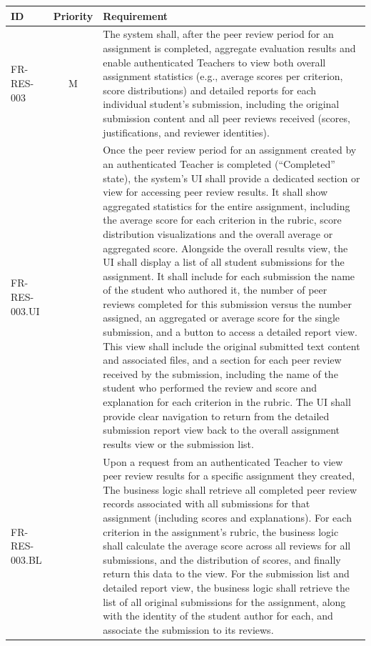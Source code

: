\begin{longtable}{|l|c|p{10cm}|}
    \hline
    \textbf{ID} & \textbf{Priority} & \textbf{Requirement} \\
    \endhead %
    \hline
    FR-RES-003 & M & The system shall, after the peer review period for an assignment is completed, aggregate evaluation results and enable authenticated Teachers to view both overall assignment statistics (e.g., average scores per criterion, score distributions) and detailed reports for each individual student's submission, including the original submission content and all peer reviews received (scores, justifications, and reviewer identities). \\
    \quad FR-RES-003.UI &  & \quad Once the peer review period for an assignment created by an authenticated Teacher is completed (“Completed” state), the system's UI shall provide a dedicated section or view for accessing peer review results. It shall show aggregated statistics for the entire assignment, including the average score for each criterion in the rubric, score distribution visualizations and the overall average or aggregated score. Alongside the overall results view, the UI shall display a list of all student submissions for the assignment. It shall include for each submission the name of the student who authored it, the number of peer reviews completed for this submission versus the number assigned, an aggregated or average score for the single submission, and a button to access a detailed report view. This view shall include the original submitted text content and associated files, and a section for each peer review received by the submission, including the name of the student who performed the review and score and explanation for each criterion in the rubric. The UI shall provide clear navigation to return from the detailed submission report view back to the overall assignment results view or the submission list. \\
    \quad FR-RES-003.BL &  & \quad Upon a request from an authenticated Teacher to view peer review results for a specific assignment they created, The business logic shall retrieve all completed peer review records associated with all submissions for that assignment (including scores and explanations). For each criterion in the assignment's rubric, the business logic shall calculate the average score across all reviews for all submissions, and the distribution of scores, and finally return this data to the view. For the submission list and detailed report view, the business logic shall retrieve the list of all original submissions for the assignment, along with the identity of the student author for each, and associate the submission to its reviews. 
    \hline
\end{longtable}
